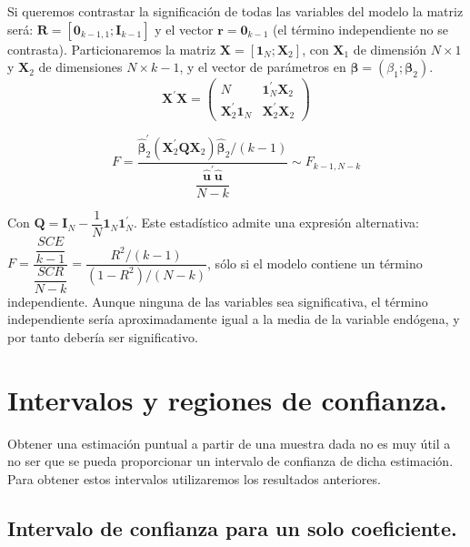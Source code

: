 Si queremos contrastar la significaci\'on de todas las variables del
modelo la matriz ser\'a: $\boldsymbol{R}=\left[\boldsymbol{0}_{k-1,1};\boldsymbol{I}_{k-1}\right]$
y el vector $\boldsymbol{r}=\boldsymbol{0}_{k-1}$ (el t\'ermino independiente
no se contrasta). Particionaremos la matriz $\boldsymbol{X}=\left[\boldsymbol{1}_{N};\boldsymbol{X}_{2}\right]$,
con $\boldsymbol{X}_{1}$ de dimensi\'on $N\times1$ y $\boldsymbol{X}_{2}$
de dimensiones $N\times k-1$, y el vector de par\'ametros en $\boldsymbol{\beta}=\left(\beta_{1};\boldsymbol{\beta}_{2}\right)$.
\[
\boldsymbol{X}^{\prime}\boldsymbol{X}=\left(\begin{array}{cc}
N & \boldsymbol{1}^{\prime}_{N}\boldsymbol{X}_{2}\\
\boldsymbol{X}^{\prime}_{2}\boldsymbol{1}_{N} & \boldsymbol{X}^{\prime}_{2}\boldsymbol{X}_{2}
\end{array}\right)
\]


\[
F=\dfrac{\hat{\boldsymbol{\beta}}^{\prime}_{2}\left(\boldsymbol{X}^{\prime}_{2}\boldsymbol{Q}\boldsymbol{X}_{2}\right)\hat{\boldsymbol{\beta}}_{2}/\left(k-1\right)}{\dfrac{\hat{\boldsymbol{u}}^{\prime}\hat{\boldsymbol{u}}}{N-k}}\sim F_{k-1,N-k}
\]


Con $\boldsymbol{Q}=\boldsymbol{I}_{N}-\dfrac{1}{N}\boldsymbol{1}_{N}\boldsymbol{1}^{\prime}_{N}$.
Este estad\'istico admite una expresi\'on alternativa: $F=\dfrac{\dfrac{SCE}{k-1}}{\dfrac{SCR}{N-k}}=\dfrac{R^{2}/\left(k-1\right)}{\left(1-R^{2}\right)/\left(N-k\right)}$,
s\'olo si el modelo contiene un t\'ermino independiente. Aunque ninguna
de las variables sea significativa, el t\'ermino independiente ser\'ia
aproximadamente igual a la media de la variable end\'ogena, y por tanto
deber\'ia ser significativo.


\section{Intervalos y regiones de confianza.}

Obtener una estimaci\'on puntual a partir de una muestra dada no es
muy \'util a no ser que se pueda proporcionar un intervalo de confianza
de dicha estimaci\'on. Para obtener estos intervalos utilizaremos los
resultados anteriores.


\subsection{Intervalo de confianza para un solo coeficiente.}

